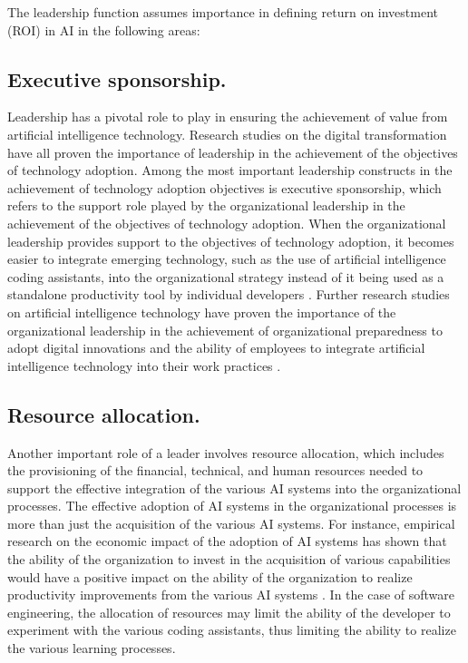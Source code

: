 The leadership function assumes importance in defining return on investment (ROI) in AI in the following areas:

\subsection {Executive sponsorship.}
\label{sec:Executive sponsorship}
Leadership has a pivotal role to play in ensuring the achievement of value from artificial intelligence technology. Research studies on the digital transformation have all proven the importance of leadership in the achievement of the objectives of technology adoption. Among the most important leadership constructs in the achievement of technology adoption objectives is executive sponsorship, which refers to the support role played by the organizational leadership in the achievement of the objectives of technology adoption. When the organizational leadership provides support to the objectives of technology adoption, it becomes easier to integrate emerging technology, such as the use of artificial intelligence coding assistants, into the organizational strategy instead of it being used as a standalone productivity tool by individual developers \autocite{Schneider2023}. Further research studies on artificial intelligence technology have proven the importance of the organizational leadership in the achievement of organizational preparedness to adopt digital innovations and the ability of employees to integrate artificial intelligence technology into their work practices \autocite{An2024}.

\subsection {Resource allocation.}
\label{sec:Resource allocation}
Another important role of a leader involves resource allocation, which includes the provisioning of the financial, technical, and human resources needed to support the effective integration of the various AI systems into the organizational processes. The effective adoption of AI systems in the organizational processes is more than just the acquisition of the various AI systems. For instance, empirical research on the economic impact of the adoption of AI systems has shown that the ability of the organization to invest in the acquisition of various capabilities would have a positive impact on the ability of the organization to realize productivity improvements from the various AI systems \autocite{Babina2024}. In the case of software engineering, the allocation of resources may limit the ability of the developer to experiment with the various coding assistants, thus limiting the ability to realize the various learning processes.

